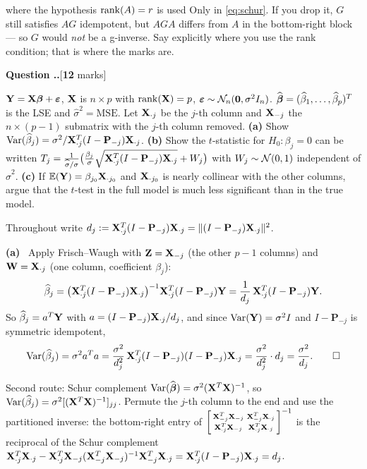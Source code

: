 \documentclass[11pt]{article}
\newcommand{\wh}[1]{\widehat{#1}}
\newcommand{\Pj}{\mathbf{P}}
\newcommand{\MSE}{\mathrm{MSE}}
\newcounter{qq}[section]
\newcommand{\qhead}[2]{\medskip\refstepcounter{qq}%
  \noindent\textbf{\color{Blue}Question \thesection.\theqq.}\hfill\textnormal{[\textbf{#1} marks]}%
  \ifx\relax#2\relax\else\par\smallskip\fi}
\newcommand{\pt}[1]{\smallskip\noindent\textbf{(#1)}\ }
\begin{document}
\begin{confusion}{where the hypothesis $\operatorname{rank}(A)=r$ is used}
Only in \eqref{eq:schur}. If you drop it, $G$ still satisfies $AG$ idempotent, but $AGA$
differs from $A$ in the bottom-right block --- so $G$ would \emph{not} be a g-inverse. Say
explicitly where you use the rank condition; that is where the marks are.
\end{confusion}

\qhead{12}{}
\begin{stmt}
$\mathbf{Y}=\mathbf{X}\boldsymbol{\beta}+\boldsymbol{\varepsilon}$, $\mathbf{X}$ is $n\times p$ with $\operatorname{rank}(\mathbf{X})=p$, $\boldsymbol{\varepsilon}\sim\mathcal{N}_n(\mathbf{0},\sigma^2I_n)$.
$\wh\bb=(\wh\beta_1,\dots,\wh\beta_p)^T$ is the LSE and $\wh\sigma^2=\MSE$. Let
$\mathbf{X}_{\cdot j}$ be the $j$-th column and $\mathbf{X}_{-j}$ the $n\times(p-1)$ submatrix with the
$j$-th column removed.
\textbf{(a)} Show $\Var(\wh\beta_j)=\sigma^2/\bX_{\cdot j}^T(I-\Pj_{-j})\bX_{\cdot j}$.
\textbf{(b)} Show the $t$-statistic for $H_0:\beta_j=0$ can be written
$T_j=\frac{1}{\wh\sigma/\sigma}\big(\frac{\beta_j}{\sigma}\sqrt{\bX_{\cdot j}^T(I-\Pj_{-j})\bX_{\cdot j}}+W_j\big)$
with $W_j\sim\mathcal{N}(0,1)$ independent of $\wh\sigma^2$.
\textbf{(c)} If $\mathbb{E}(\mathbf{Y})=\beta_{j_0}\mathbf{X}_{\cdot j_0}$ and $\mathbf{X}_{\cdot j_0}$ is nearly collinear
with the other columns, argue that the $t$-test in the full model is much less significant
than in the true model.
\end{stmt}

Throughout write $d_j:=\bX_{\cdot j}^T(I-\Pj_{-j})\bX_{\cdot j}=\|(I-\Pj_{-j})\bX_{\cdot j}\|^2$.

\pt{a} Apply Frisch--Waugh with $\mathbf{Z}=\mathbf{X}_{-j}$ (the other $p-1$ columns) and
$\mathbf{W}=\mathbf{X}_{\cdot j}$ (one column, coefficient $\beta_j$):
\[
  \wh\beta_j=\big(\bX_{\cdot j}^T(I-\Pj_{-j})\bX_{\cdot j}\big)^{-1}\bX_{\cdot j}^T(I-\Pj_{-j})\bY
  =\frac{1}{d_j}\,\bX_{\cdot j}^T(I-\Pj_{-j})\bY .
\]
So $\wh\beta_j=a^T\bY$ with $a=(I-\Pj_{-j})\bX_{\cdot j}/d_j$, and since
$\operatorname{Var}(\mathbf{Y})=\sigma^2I$ and $I-\Pj_{-j}$ is symmetric idempotent,
\[
  \Var(\wh\beta_j)=\sigma^2a^Ta
  =\frac{\sigma^2}{d_j^2}\,\bX_{\cdot j}^T(I-\Pj_{-j})(I-\Pj_{-j})\bX_{\cdot j}
  =\frac{\sigma^2}{d_j^2}\cdot d_j=\frac{\sigma^2}{d_j}. \qquad\square
\]

\begin{idea}{Second route: Schur complement}
$\Var(\wh\bb)=\sigma^2(\bX^T\bX)^{-1}$, so $\Var(\wh\beta_j)=\sigma^2[(\bX^T\bX)^{-1}]_{jj}$.
Permute the $j$-th column to the end and use the partitioned inverse: the bottom-right entry
of $\begin{bsmallmatrix}\mathbf{X}_{-j}^T\mathbf{X}_{-j}&\mathbf{X}_{-j}^T\mathbf{X}_{\cdot j}\\
\mathbf{X}_{\cdot j}^T\mathbf{X}_{-j}&\mathbf{X}_{\cdot j}^T\mathbf{X}_{\cdot j}\end{bsmallmatrix}^{-1}$ is the
reciprocal of the Schur complement
$\bX_{\cdot j}^T\bX_{\cdot j}-\bX_{\cdot j}^T\bX_{-j}(\bX_{-j}^T\bX_{-j})^{-1}\bX_{-j}^T\bX_{\cdot j}
=\bX_{\cdot j}^T(I-\Pj_{-j})\bX_{\cdot j}=d_j$.
\end{idea}
\end{document}
